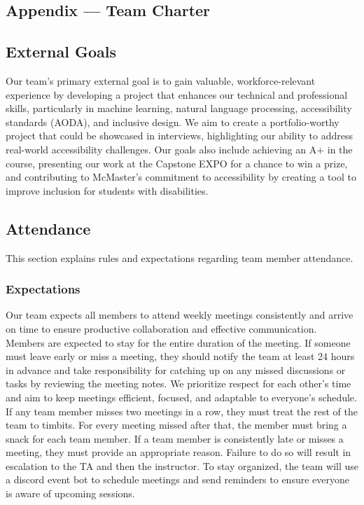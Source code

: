 \documentclass{article}
\begin{document}
\begin{enumerate}
\section*{Appendix --- Team Charter}


\subsection*{External Goals}

Our team’s primary external goal is to gain valuable, workforce-relevant experience by 
developing a project that enhances our technical and professional skills, particularly 
in machine learning, natural language processing, accessibility standards (AODA), and inclusive design. We aim
to create a portfolio-worthy project that could be showcased in interviews, 
highlighting our ability to address real-world accessibility challenges. Our goals also 
include achieving an A+ in the course, presenting our work at the Capstone EXPO for a chance 
to win a prize, and contributing to McMaster's commitment to accessibility by creating a tool to 
improve inclusion for students with disabilities.  

\subsection*{Attendance}
This section explains rules and expectations regarding team member attendance.

\subsubsection*{Expectations}

Our team expects all members to attend weekly meetings consistently and arrive 
on time to ensure productive collaboration and effective communication. Members 
are expected to stay for the entire duration of the meeting. If someone must 
leave early or miss a meeting, they should notify the team at least 24 hours 
in advance and take responsibility for catching up on any missed discussions 
or tasks by reviewing the meeting notes. We prioritize respect for each other’s time and aim to keep meetings efficient, 
focused, and adaptable to everyone’s schedule. If any team member misses two 
meetings in a row, they must treat the rest of the team to timbits. For every 
meeting missed after that, the member must bring a snack for each team member.
If a team member is consistently late or misses a meeting, they must provide an 
appropriate reason. Failure to do so will result in escalation to the TA and 
then the instructor. To stay organized, the team will use a discord event bot to 
schedule meetings and send reminders to ensure everyone is aware of upcoming 
sessions. 

\end{enumerate}
\end{document}
